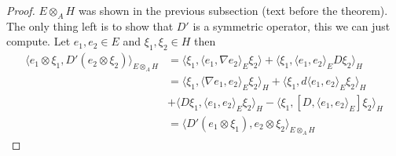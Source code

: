 \begin{proof}
    $E\otimes _A H$ was shown in the previous subsection (text before the
    theorem). The only thing left is to show that $D'$ is a symmetric
    operator, this we can just compute. Let $e_1, e_2 \in E$ and $\xi _1,
    \xi _2 \in H$ then
    \begin{align}
        \langle e_1 \otimes \xi _1, D'(e_2 \otimes \xi_2)\rangle _{E\otimes _A H} &=
        \langle \xi _1, \langle e_1, \nabla e_2\rangle _E  \xi _2\rangle  + \langle \xi _1 , \langle e_1, e_2\rangle _E D\xi
        _2\rangle _H \\
        &= \langle \xi _1, \langle \nabla e_1, e_2\rangle _E \xi _2\rangle _H + \langle \xi _1, d\langle e_1, e_2\rangle  _E
        \xi _2\rangle _H \\
        &+ \langle D\xi _1,\langle e_1, e_2\rangle _E \xi _2\rangle _H - \langle \xi _1, [D, \langle e_1, e_2\rangle _E] \xi
        _2 \rangle _H \\
        &= \langle D'(e_1 \otimes \xi _1), e_2 \otimes \xi _2\rangle _{E \otimes _A H}
    \end{align}
\end{proof}

%
%

